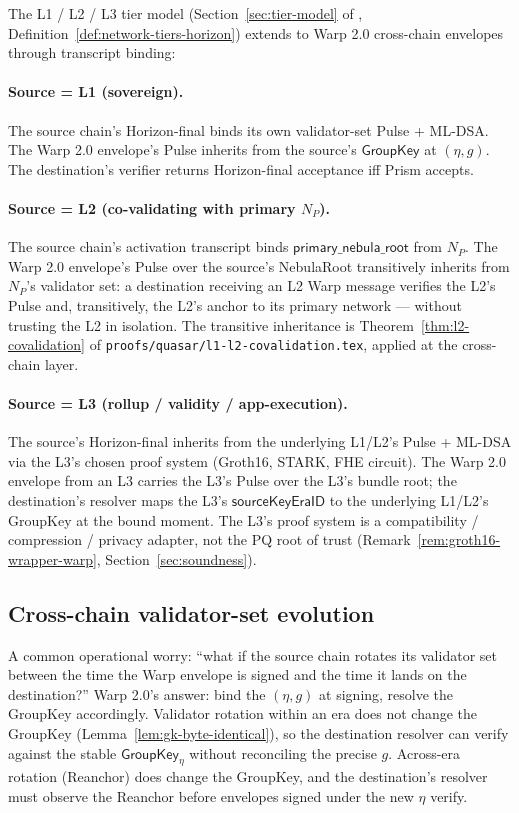 The L1 / L2 / L3 tier model (Section~\ref{sec:tier-model} of \cite{luxquasarhorizon}, Definition~\ref{def:network-tiers-horizon}) extends to Warp 2.0 cross-chain envelopes through transcript binding:

\paragraph{Source = L1 (sovereign).} The source chain's Horizon-final binds its own validator-set Pulse + ML-DSA. The Warp 2.0 envelope's Pulse inherits from the source's $\mathsf{GroupKey}$ at $(\eta, g)$. The destination's verifier returns Horizon-final acceptance iff Prism accepts.

\paragraph{Source = L2 (co-validating with primary $N_P$).} The source chain's activation transcript binds $\mathsf{primary\_nebula\_root}$ from $N_P$. The Warp 2.0 envelope's Pulse over the source's NebulaRoot transitively inherits from $N_P$'s validator set: a destination receiving an L2 Warp message verifies the L2's Pulse and, transitively, the L2's anchor to its primary network --- without trusting the L2 in isolation. The transitive inheritance is Theorem~\ref{thm:l2-covalidation} of \texttt{proofs/quasar/l1-l2-covalidation.tex}, applied at the cross-chain layer.

\paragraph{Source = L3 (rollup / validity / app-execution).} The source's Horizon-final inherits from the underlying L1/L2's Pulse + ML-DSA via the L3's chosen proof system (Groth16, STARK, FHE circuit). The Warp 2.0 envelope from an L3 carries the L3's Pulse over the L3's bundle root; the destination's resolver maps the L3's $\mathsf{sourceKeyEraID}$ to the underlying L1/L2's GroupKey at the bound moment. The L3's proof system is a compatibility / compression / privacy adapter, not the PQ root of trust (Remark~\ref{rem:groth16-wrapper-warp}, Section~\ref{sec:soundness}).

\subsection{Cross-chain validator-set evolution}

A common operational worry: ``what if the source chain rotates its validator set between the time the Warp envelope is signed and the time it lands on the destination?'' Warp 2.0's answer: bind the $(\eta, g)$ at signing, resolve the GroupKey accordingly. Validator rotation within an era does not change the GroupKey (Lemma~\ref{lem:gk-byte-identical}), so the destination resolver can verify against the stable $\mathsf{GroupKey}_\eta$ without reconciling the precise $g$. Across-era rotation (Reanchor) does change the GroupKey, and the destination's resolver must observe the Reanchor before envelopes signed under the new $\eta$ verify.

